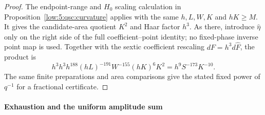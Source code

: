 \documentclass[11pt]{amsart}
\theoremstyle{definition}
\theoremstyle{remark}
\numberwithin{equation}{section}
\begin{document}
\begin{proof}
The endpoint-range and $H_0$ scaling calculation in Proposition~\ref{low:5:qsc:curvature} applies with the same $h,L,W,K$ and $hK\ge M$. It gives the candidate-area quotient $K^2$ and Haar factor $h^3$. As there, introduce $\widehat\eta$ only on the right side of the full coefficient--point identity; no fixed-phase inverse point map is used. Together with the sextic coefficient rescaling $dF=h^3d\widehat F$, the product is
\begin{equation}\label{low:6:nc36:inflection-intrinsic-h}
h^3h^3h^{188}(hL)^{-191}W^{-155}(hK)^6K^2
=h^9S^{-173}K^{-10}.
\end{equation}
The same finite preparations and area comparisons give the stated fixed power of $q^{-1}$ for a fractional certificate.
\end{proof}

\paragraph{Exhaustion and the uniform amplitude sum}
\end{document}
